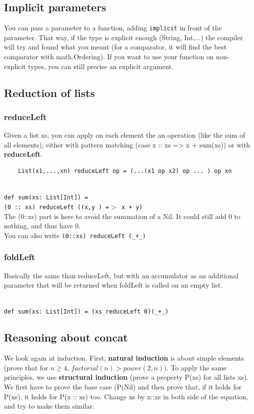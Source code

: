 \documentclass[12pt,a4paper]{article}
\begin{document}
\subsection{Implicit parameters}
You can pass a parameter to a function, adding \texttt{implicit} in front of the parameter. That way, if the type is explicit enough (String, Int,...) the compiler will try and found what you meant (for a comparator, it will find the best comparator with math.Ordering). If you want to use your function on non-explicit types, you can still precise an explicit argument.

\subsection{Reduction of lists}
\subsubsection{reduceLeft}
Given a list xs, you can apply on each element the an operation (like the sum of all elements), either with pattern matching (case x :: xs => x + sum(xs)) or with \textbf{reduceLeft}.
\begin{verbatim}
	List(x1,...,xn) reduceLeft op = (...(x1 op x2) op ... ) op xn
\end{verbatim}
\begin{exemple}~\\
	\texttt{def sum(xs: List[Int]) = \\(0 :: xs) reduceLeft ((x,y ) =$>$ x + y)}\\
	The (0::xs) part is here to avoid the summation of a Nil. It could still add 0 to nothing, and thus have 0.\\
	You can also write \texttt{(0::xs) reduceLeft (\_+\_)}
\end{exemple}

\subsubsection{foldLeft}
Basically the same than reduceLeft, but with an accumulator	as an additional parameter that will be returned when foldLeft is called on an empty list.
\begin{exemple}~\\
\texttt{def sum(xs: List[Int]) = (xs reduceLeft 0)(\_+\_)}
\end{exemple}

\subsection{Reasoning about concat}
We look again at induction. First, \textbf{natural induction} is about simple elements (prove that for $n \geq 4$, $factorial(n) > power(2, n)$). To apply the same principles, we use \textbf{structural induction} (prove a property P(xs) for all lists xs). We first have to prove the base case (P(Nil) and then prove that, if it holds for P(xs), it holds for P(x :: xs) too. Change xs by x::xs in both side of the equation, and try to make them similar.
\end{document}
